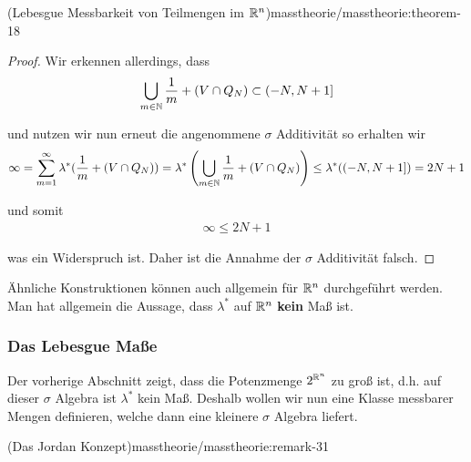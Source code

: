\begin{theorem}{(Lebesgue Messbarkeit von Teilmengen im \protect\(\mathbb{R}^n\protect\))}{masstheorie/masstheorie:theorem-18}
\begin{proof}
\par
Wir erkennen allerdings, dass
\begin{align*}
\bigcup_{m\in\mathbb{N}} \frac{1}{m}+(V\cap Q_N) \subset (-N,N+1]
\end{align*}
\par
und nutzen wir nun erneut die angenommene \(\sigma\) Additivität so erhalten wir
\begin{align*}
\infty = \sum_{m=1}^\infty \lambda^\ast(\frac{1}{m}+(V\cap Q_N)) = 
\lambda^\ast\left(\bigcup_{m\in\mathbb{N}}  \frac{1}{m}+(V\cap Q_N) \right)\leq 
\lambda^\ast((-N,N+1]) = 2N + 1
\end{align*}
\par
und somit
\begin{align*}
\infty \leq 2N + 1
\end{align*}
\par
was ein Widerspruch ist. Daher ist die Annahme der \(\sigma\) Additivität falsch.
\end{proof}

\par
Ähnliche Konstruktionen können auch allgemein für \(\mathbb{R}^n\) durchgeführt werden. Man hat allgemein die Aussage, dass \(\lambda^\ast\) auf \(\mathbb{R}^n\) \textbf{kein} Maß ist.


\subsubsection{Das Lebesgue Maße}
\label{\detokenize{masstheorie/masstheorie:das-lebesgue-masze}}
\par
Der vorherige Abschnitt zeigt, dass die Potenzmenge \(2^{\mathbb{R}^n}\) zu groß ist, d.h. auf dieser \(\sigma\) Algebra ist \(\lambda^\ast\) kein Maß. Deshalb wollen wir nun eine Klasse messbarer Mengen definieren, welche dann eine kleinere \(\sigma\) Algebra liefert.
\begin{remark}{(Das Jordan Konzept)}{masstheorie/masstheorie:remark-31}




\end{remark}
\end{theorem}
